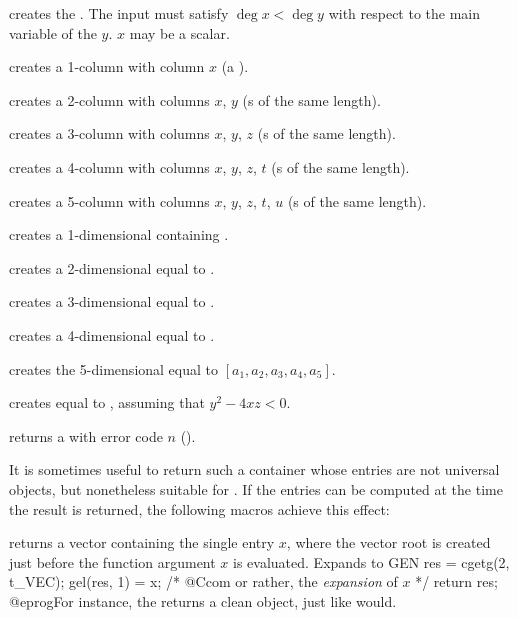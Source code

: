  creates the  .
The input must satisfy $\deg x < \deg y$ with respect to the main variable of
the  $y$. $x$ may be a scalar.

 creates a 1-column  with column $x$
(a ).

 creates a 2-column  with columns
$x$, $y$ (s of the same length).

 creates a 3-column  with columns
$x$, $y$, $z$ (s of the same length).

 creates a 4-column 
with columns $x$, $y$, $z$, $t$ (s of the same length).

 creates a 5-column
 with columns $x$, $y$, $z$, $t$, $u$ (s of the same
length).

 creates a 1-dimensional  containing .

 creates a 2-dimensional  equal to
\kbd{[x,y]}.

 creates a 3-dimensional 
equal to \kbd{[x,y,z]}.

 creates a 4-dimensional 
equal to \kbd{[x,y,z,t]}.

 creates the
5-dimensional  equal to $[a_1,a_2,a_3,a_4,a_5]$.

 creates  equal
to , assuming that $y^2 - 4xz < 0$.

 returns a  with error code $n$
().

\smallskip

It is sometimes useful to return such a container whose entries are not
universal objects, but nonetheless suitable for .
If the entries can be computed at the time the result is returned, the
following macros achieve this effect:

 returns a vector containing the single entry $x$,
where the vector root is created just before the function argument $x$ is
evaluated. Expands to
\bprog
  {
    GEN res = cgetg(2, t_VEC);
    gel(res, 1) = x; /* @Ccom or rather, the \emph{expansion} of $x$ */
    return res;
  }
@eprog\noindent For instance, the  returns a clean
object, just like  would.

